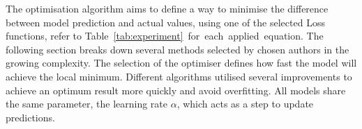 The optimisation algorithm aims to define a way to minimise the difference between model prediction and actual values, using one of the selected Loss functions, refer to \mbox{Table~\ref{tab:experiment} for each applied equation}.
The following section breaks down several methods selected by chosen authors in the growing complexity.
The selection of the optimiser defines how fast the model will achieve the local minimum.
Different algorithms utilised several improvements to achieve an optimum result more quickly and avoid overfitting.
All models share the same parameter, the learning rate $\alpha$, which acts as a step to update predictions.

